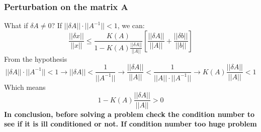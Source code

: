 \subsubsection{Perturbation on the matrix A}
What if $\delta A\neq 0$? If $||\delta A||\cdot||A^{-1}||<1$, we can:
$$
\frac{||\delta x||}{||x||}
\leq
\frac{K(A)}{1-K(A)\frac{||\delta A||}{||A||}}
\left[
    \frac{||\delta A||}{||A||}+\frac{||\delta b||}{||b||}
\right]
$$
From the hypothesis
$$
||\delta A||\cdot||A^{-1}||<1
\rightarrow
||\delta A||<\frac{1}{||A^{-1}||}
\rightarrow
\frac{||\delta A||}{||A||}<\frac{1}{||A||\cdot||A^{-1}||}
\rightarrow
K(A)\frac{||\delta A||}{||A||}<1
$$
Which means
$$
1-K(A)\frac{||\delta A||}{||A||}>0
$$
\textbf{In conclusion, before solving a problem check the condition number to see if it is ill conditioned or not. If condition number too huge problem}